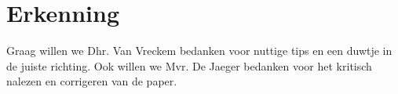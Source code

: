 \documentclass[conference]{IEEEtran}
\begin{document}
\section*{Erkenning}

Graag willen we Dhr. Van Vreckem bedanken voor nuttige tips en een duwtje in de juiste richting. Ook willen we Mvr. De Jaeger bedanken voor het kritisch nalezen en corrigeren van de paper. 

\nocite{baldwin1956optimum,bain1992introduction,kendall2003evolution}


\end{document}
